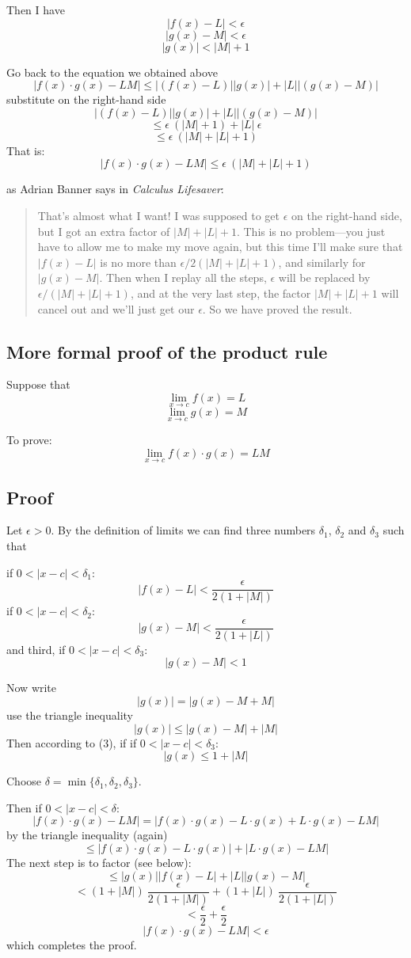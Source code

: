 \documentclass[11pt, oneside]{article}   	%
\begin{document}
Then I have
\[ |f(x) - L | < \epsilon \]
\[ |g(x) - M | < \epsilon \]
\[ |g(x)| < |M| + 1 \]

Go back to the equation we obtained above
\[ |f(x) \cdot g(x) - LM| \le |(f(x) - L) | | g(x)| + | L | | (g(x) - M )| \]
substitute on the right-hand side
\[ |(f(x) - L) | | g(x)| + | L | | (g(x) - M )| \]
\[ \le \epsilon \ (|M| + 1) + | L | \ \epsilon \]
\[ \le \epsilon \ (|M| + |L| + 1) \]
That is:
\[ |f(x) \cdot g(x) - LM| \le \epsilon \ (|M| + |L| + 1) \]

as Adrian Banner says in \emph{Calculus Lifesaver}:

\begin{quote}
That's almost what I want!  I was supposed to get $\epsilon$ on the right-hand side, but I got an extra factor of $|M| + |L| + 1$.  This is no problem---you just have to allow me to make my move again, but this time I'll make sure that $|f(x) - L|$ is no more than $\epsilon/2(|M| + |L| + 1)$, and similarly for $|g(x) - M|$.  Then when I replay all the steps, $\epsilon$ will be replaced by $\epsilon/(|M| + |L| + 1)$, and at the very last step, the factor $|M| + |L| + 1$ will cancel out and we'll just get our $\epsilon$.  So we have proved the result.
\end{quote}

\subsection*{More formal proof of the product rule}

Suppose that 
\[ \lim_{x \rightarrow c} f(x) = L \]
\[ \lim_{x \rightarrow c} g(x) = M \]

To prove:
\[ \lim_{x \rightarrow c} f(x) \cdot g(x) = LM \]

\subsection*{Proof}
Let $\epsilon > 0$.  By the definition of limits we can find three numbers $\delta_1$, $\delta_2$ and $\delta_3$ such that

if $0 < |x - c| < \delta_1$:
\[ |f(x) - L| < \frac{\epsilon}{2(1 + |M|)} \]
if $0 < |x - c| < \delta_2$:
\[ |g(x) - M| < \frac{\epsilon}{2(1 + |L|)} \]
and third, if $0 < |x - c| < \delta_3$:
\[ |g(x) - M| < 1 \]

Now write
\[ |g(x)| = |g(x) - M + M| \]
use the triangle inequality
\[ |g(x)| \le |g(x) - M| + |M|\]
Then according to (3), if if $0 < |x - c| < \delta_3$:
\[ |g(x) \le 1 + |M|  \]

Choose $\delta = \min \{\delta_1,\delta_2,\delta_3\}$.

Then if $0 < |x - c| < \delta$:
\[ |f(x) \cdot g(x) - LM| = |f(x) \cdot g(x) - L \cdot g(x) + L \cdot g(x) - LM| \]
by the triangle inequality (again)
\[ \le |f(x) \cdot g(x) - L \cdot g(x)| + |L \cdot g(x) - LM| \]
The next step is to factor (see below):
\[ \le |g(x)| |f(x) - L| + |L| |g(x) - M| \]
\[ < (1 + |M|) \ \frac{\epsilon}{2(1 + |M|)} + (1 + |L|) \ \frac{\epsilon}{2(1 + |L|)} \]
\[ < \frac{\epsilon}{2} + \frac{\epsilon}{2} \]
\[ |f(x) \cdot g(x) - LM| < \epsilon \]
which completes the proof.
\end{document}
